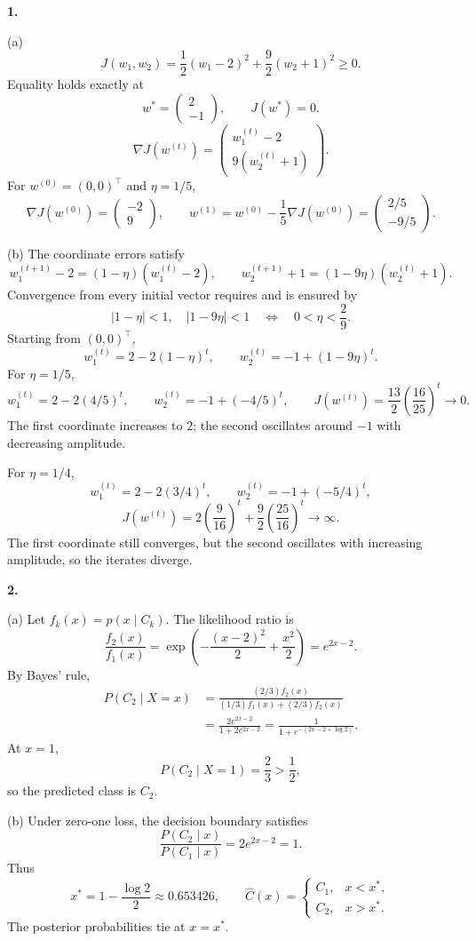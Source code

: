 \documentclass[11pt,a4paper]{article}
\begin{document}
\textbf{1.}

(a)
\[
J(w_1,w_2)=\frac12(w_1-2)^2+\frac92(w_2+1)^2\geq0.
\]
Equality holds exactly at
\[
w^*=\begin{pmatrix}2\\-1\end{pmatrix},\qquad J(w^*)=0.
\]
\[
\nabla J(w^{(t)})=
\begin{pmatrix}w_1^{(t)}-2\\9(w_2^{(t)}+1)\end{pmatrix}.
\]
For $w^{(0)}=(0,0)^\top$ and $\eta=1/5$,
\[
\nabla J(w^{(0)})=\begin{pmatrix}-2\\9\end{pmatrix},\qquad
w^{(1)}=w^{(0)}-\frac15\nabla J(w^{(0)})
=\begin{pmatrix}2/5\\-9/5\end{pmatrix}.
\]

(b) The coordinate errors satisfy
\[
w_1^{(t+1)}-2=(1-\eta)(w_1^{(t)}-2),\qquad
w_2^{(t+1)}+1=(1-9\eta)(w_2^{(t)}+1).
\]
Convergence from every initial vector requires and is ensured by
\[
|1-\eta|<1,\quad |1-9\eta|<1
\quad\Longleftrightarrow\quad 0<\eta<\frac29.
\]
Starting from $(0,0)^\top$,
\[
w_1^{(t)}=2-2(1-\eta)^t,\qquad
w_2^{(t)}=-1+(1-9\eta)^t.
\]
For $\eta=1/5$,
\[
w_1^{(t)}=2-2(4/5)^t,\qquad
w_2^{(t)}=-1+(-4/5)^t,\qquad
J(w^{(t)})=\frac{13}{2}\left(\frac{16}{25}\right)^t\longrightarrow0.
\]
The first coordinate increases to $2$; the second oscillates around $-1$
with decreasing amplitude.

For $\eta=1/4$,
\[
w_1^{(t)}=2-2(3/4)^t,\qquad
w_2^{(t)}=-1+(-5/4)^t,
\]
\[
J(w^{(t)})=2\left(\frac9{16}\right)^t
+\frac92\left(\frac{25}{16}\right)^t\longrightarrow\infty.
\]
The first coordinate still converges, but the second oscillates with
increasing amplitude, so the iterates diverge.

\newpage
\textbf{2.}

(a) Let $f_k(x)=p(x\mid C_k)$. The likelihood ratio is
\[
\frac{f_2(x)}{f_1(x)}
=\exp\left(-\frac{(x-2)^2}{2}+\frac{x^2}{2}\right)
=e^{2x-2}.
\]
By Bayes' rule,
\begin{align*}
P(C_2\mid X=x)
&=\frac{(2/3)f_2(x)}{(1/3)f_1(x)+(2/3)f_2(x)}\\
&=\frac{2e^{2x-2}}{1+2e^{2x-2}}
=\frac{1}{1+e^{-(2x-2+\log2)}}.
\end{align*}
At $x=1$,
\[
P(C_2\mid X=1)=\frac23>\frac12,
\]
so the predicted class is $C_2$.

(b) Under zero-one loss, the decision boundary satisfies
\[
\frac{P(C_2\mid x)}{P(C_1\mid x)}=2e^{2x-2}=1.
\]
Thus
\[
x^*=1-\frac{\log2}{2}\approx0.653426,
\qquad
\widehat C(x)=
\begin{cases}
C_1,&x<x^*,\\
C_2,&x>x^*.
\end{cases}
\]
The posterior probabilities tie at $x=x^*$.
\end{document}
